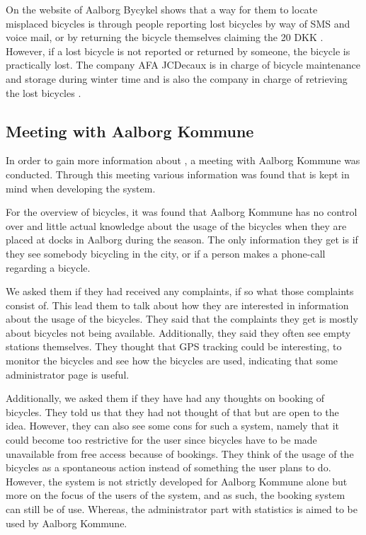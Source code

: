 On the website of Aalborg Bycykel shows that a way for them to locate misplaced bicycles is through people reporting lost bicycles by way of SMS and voice mail, or by returning the bicycle themselves claiming the 20 DKK \citep{misc:aalborgbycykelmangler}.
However, if a lost bicycle is not reported or returned by someone, the bicycle is practically lost.
The company AFA JCDecaux is in charge of bicycle maintenance and storage during winter time and is also the company in charge of retrieving the lost bicycles \citep{misc:aalborgcykling}.

\subsection{Meeting with Aalborg Kommune}\label{subsec:meetingaalborg}
In order to gain more information about \bycykelwithoutspace, a meeting with Aalborg Kommune was conducted. 
Through this meeting various information was found that is kept in mind when developing the system.

For the overview of bicycles, it was found that Aalborg Kommune has no control over and little actual knowledge about the usage of the bicycles when they are placed at docks in Aalborg during the season.
The only information they get is if they see somebody bicycling in the city, or if a person makes a phone-call regarding a bicycle.

We asked them if they had received any complaints, if so what those complaints consist of.
This lead them to talk about how they are interested in information about the usage of the bicycles.
They said that the complaints they get is mostly about bicycles not being available.
Additionally, they said they often see empty stations themselves.
They thought that GPS tracking could be interesting, to monitor the bicycles and see how the bicycles are used, indicating that some administrator page is useful.

Additionally, we asked them if they have had any thoughts on booking of bicycles.
They told us that they had not thought of that but are open to the idea.
However, they can also see some cons for such a system, namely that it could become too restrictive for the user since bicycles have to be made unavailable from free access because of bookings.
They think of the usage of the bicycles as a spontaneous action instead of something the user plans to do.
However, the system is not strictly developed for Aalborg Kommune alone but more on the focus of the users of the system, and as such, the booking system can still be of use.
Whereas, the administrator part with statistics is aimed to be used by Aalborg Kommune.

